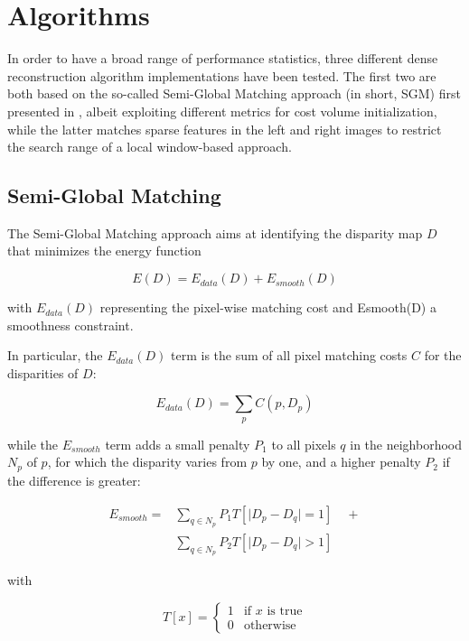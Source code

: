 \section{Algorithms}\label{ch:chapter03_03}

In order to have a broad range of performance statistics, three different dense reconstruction algorithm implementations have been tested. The first two are both based on the so-called Semi-Global Matching approach (in short, SGM) first presented in \cite{Hirschmuller2005}, albeit exploiting different metrics for cost volume initialization, while the latter \cite{Geiger2011} matches sparse features in the left and right images to restrict the search range of a local window-based approach.

\subsection{Semi-Global Matching}\label{ch:chapter03_03_01}

The Semi-Global Matching approach aims at identifying the disparity map $D$ that minimizes the energy function

\begin{equation}\label{eq:cp03_SGM_energy}
E(D) = E_{data}(D) + E_{smooth}(D)
\end{equation}

with $E_{data}(D)$ representing the pixel-wise matching cost and Esmooth(D) a smoothness constraint.

In particular, the $E_{data}(D)$ term is the sum of all pixel matching costs $C$ for the disparities of $D$:

\begin{equation}\label{eq:cp03_SGM_energy_data}
E_{data}(D) = \sum_p C(p, D_p)
\end{equation}

while the $E_{smooth}$ term adds a small penalty $P_1$ to all pixels $q$ in the neighborhood $N_p$ of $p$, for which the disparity varies from $p$ by one, and a higher penalty $P_2$ if the difference is greater:

\begin{align}\label{eq:cp03_SGM_energy_smooth}
  E_{smooth} = & \sum_{q \in N_p} P_1 T[\lvert D_p - D_q \rvert = 1] \quad + \nonumber \\
	       & \sum_{q \in N_p} P_2 T[\lvert D_p - D_q \rvert > 1]
\end{align}

with

\begin{equation}\label{eq:cp03_SGM_energy_smooth_T}
 T[x] = \left\{ \begin{array}{ll}
         1 & \mbox{if $x$ is true}\\
         0 & \mbox{otherwise}
         \end{array} \right.
\end{equation}

